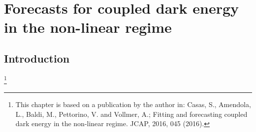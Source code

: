 \chapter{Forecasts for coupled dark energy in the non-linear regime \label{chap:Fitting-CDE}}


\section{Introduction}





\done{}
\footnote{This chapter is based on a publication by the author in: 
	Casas, S., Amendola, L., Baldi, M., Pettorino, V. and Vollmer, A.; 
	Fitting and forecasting coupled dark energy in the non-linear regime.
	JCAP, 2016, 045 (2016).}
